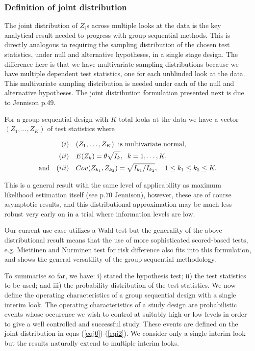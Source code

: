 \documentclass{article}
\begin{document}
\subsubsection{Definition of joint distribution}
The joint distribution of $Z_i$s across multiple looks at the data is the key analytical result needed to progress with group sequential methods. This is directly analogous to requiring the sampling distribution of the chosen test statistics, under null and alternative hypotheses, in a single stage design. The difference here is that we have multivariate sampling distributions because we have multiple dependent test statistics, one for each unblinded look at the data. This multivariate sampling distribution is needed under each of the null and alternative hypotheses. The joint distribution formulation presented next is due to Jennison\citep{Jennison:2000aa} p.49.

For a group sequential design with $K$ total looks at the data we have a vector $(Z_1,\dots,Z_K)$ of test statistics where 
 \begin{fleqn}
\begin{align}
&& (i)&\quad(Z_1,\dots,Z_K) \hspace{0.2cm}\text{is multivariate normal,}\label{eqj0} \\
&&(ii)&\quad E(Z_k)=\theta \sqrt{I_k}, \hspace{0.2cm} k=1,\dots,K,\label{eqj1}\\
&\text{and}&(iii)&\quad Cov(Z_{k_1},Z_{k_2} )= \sqrt{I_{k_1}/I_{k_2}}, \quad 1\le k_1 \le k_2 \le K.\label{eqj2}
\end{align}
\end{fleqn}
This is a general result with the same level of applicability as maximum likelihood estimation itself (see p.70 Jennison\citep{Jennison:2000aa}), however, these are of course asymptotic results, and this distributional approximation may be much less robust very early on in a trial where information levels are low. 

Our current use case utilizes a Wald test but the generality of the above distributional result means that the use of more sophisticated scored-based tests, e.g. Miettinen and Nurminen test for risk difference\citep{Miettinen:1985aa} also fits into this formulation, and shows the general versatility of the group sequential methodology.   
 
To summarise so far, we have: i) stated the hypothesis test; ii) the test statistics to be used; and iii) the probability distribution of the test statistics. We now define the operating characteristics of a group sequential design with a single interim look. The operating characteristics of a study design are probabilistic events whose occurence we wish to control at suitably high or low levels in order to give a well controlled and successful study. These events are defined on the joint distribution in eqns (\ref{eqj0})-(\ref{eqj2}). We consider only a single interim look but the results naturally extend to multiple interim looks.
\end{document}
